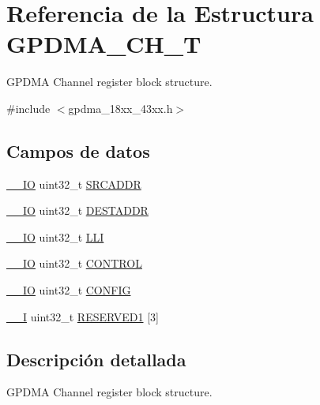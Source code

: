 \hypertarget{struct_g_p_d_m_a___c_h___t}{}\section{Referencia de la Estructura G\+P\+D\+M\+A\+\_\+\+C\+H\+\_\+T}
\label{struct_g_p_d_m_a___c_h___t}


G\+P\+D\+MA Channel register block structure.  




{\ttfamily \#include $<$gpdma\+\_\+18xx\+\_\+43xx.\+h$>$}

\subsection*{Campos de datos}
\begin{DoxyCompactItemize}
\item 
\hyperlink{core__sc300_8h_aec43007d9998a0a0e01faede4133d6be}{\+\_\+\+\_\+\+IO} uint32\+\_\+t \hyperlink{struct_g_p_d_m_a___c_h___t_a4da32b77bf7a0538659a7837c10ceeab}{S\+R\+C\+A\+D\+DR}
\item 
\hyperlink{core__sc300_8h_aec43007d9998a0a0e01faede4133d6be}{\+\_\+\+\_\+\+IO} uint32\+\_\+t \hyperlink{struct_g_p_d_m_a___c_h___t_a6607f2a52135b9e1099acccd6dc2226b}{D\+E\+S\+T\+A\+D\+DR}
\item 
\hyperlink{core__sc300_8h_aec43007d9998a0a0e01faede4133d6be}{\+\_\+\+\_\+\+IO} uint32\+\_\+t \hyperlink{struct_g_p_d_m_a___c_h___t_ac4d10dd1744ef7ee8edfaf06d2b6b0f0}{L\+LI}
\item 
\hyperlink{core__sc300_8h_aec43007d9998a0a0e01faede4133d6be}{\+\_\+\+\_\+\+IO} uint32\+\_\+t \hyperlink{struct_g_p_d_m_a___c_h___t_a60054d9772af540ff3d88432d724137f}{C\+O\+N\+T\+R\+OL}
\item 
\hyperlink{core__sc300_8h_aec43007d9998a0a0e01faede4133d6be}{\+\_\+\+\_\+\+IO} uint32\+\_\+t \hyperlink{struct_g_p_d_m_a___c_h___t_aed40378e2ce292435df51ff247d0cb78}{C\+O\+N\+F\+IG}
\item 
\hyperlink{core__sc300_8h_af63697ed9952cc71e1225efe205f6cd3}{\+\_\+\+\_\+I} uint32\+\_\+t \hyperlink{struct_g_p_d_m_a___c_h___t_a96782b173181cab0a32838de81bbe1a6}{R\+E\+S\+E\+R\+V\+E\+D1} \mbox{[}3\mbox{]}
\end{DoxyCompactItemize}


\subsection{Descripción detallada}
G\+P\+D\+MA Channel register block structure. 

